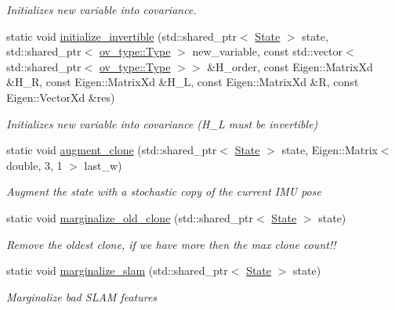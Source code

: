 \begin{DoxyCompactItemize}
\begin{DoxyCompactList}\small\item\em Initializes new variable into covariance. \end{DoxyCompactList}\item 
static void \hyperlink{classov__msckf_1_1StateHelper_adb0f34932bb91d89bfd5ae72c2e693d8}{initialize\+\_\+invertible} (std\+::shared\+\_\+ptr$<$ \hyperlink{classov__msckf_1_1State}{State} $>$ state, std\+::shared\+\_\+ptr$<$ \hyperlink{classov__type_1_1Type}{ov\+\_\+type\+::\+Type} $>$ new\+\_\+variable, const std\+::vector$<$ std\+::shared\+\_\+ptr$<$ \hyperlink{classov__type_1_1Type}{ov\+\_\+type\+::\+Type} $>$$>$ \&H\+\_\+order, const Eigen\+::\+Matrix\+Xd \&H\+\_\+R, const Eigen\+::\+Matrix\+Xd \&H\+\_\+L, const Eigen\+::\+Matrix\+Xd \&R, const Eigen\+::\+Vector\+Xd \&res)
\begin{DoxyCompactList}\small\item\em Initializes new variable into covariance (H\+\_\+L must be invertible) \end{DoxyCompactList}\item 
static void \hyperlink{classov__msckf_1_1StateHelper_ade3a86a89f15cc6e03a6430fd1dee694}{augment\+\_\+clone} (std\+::shared\+\_\+ptr$<$ \hyperlink{classov__msckf_1_1State}{State} $>$ state, Eigen\+::\+Matrix$<$ double, 3, 1 $>$ last\+\_\+w)
\begin{DoxyCompactList}\small\item\em Augment the state with a stochastic copy of the current I\+MU pose \end{DoxyCompactList}\item 
static void \hyperlink{classov__msckf_1_1StateHelper_a18f86e6da0bf5e7d4879f8c2f1460a27}{marginalize\+\_\+old\+\_\+clone} (std\+::shared\+\_\+ptr$<$ \hyperlink{classov__msckf_1_1State}{State} $>$ state)
\begin{DoxyCompactList}\small\item\em Remove the oldest clone, if we have more then the max clone count!! \end{DoxyCompactList}\item 
static void \hyperlink{classov__msckf_1_1StateHelper_a54f8517a288b9362f29481f650f4b959}{marginalize\+\_\+slam} (std\+::shared\+\_\+ptr$<$ \hyperlink{classov__msckf_1_1State}{State} $>$ state)
\begin{DoxyCompactList}\small\item\em Marginalize bad S\+L\+AM features \end{DoxyCompactList}\end{DoxyCompactItemize}


